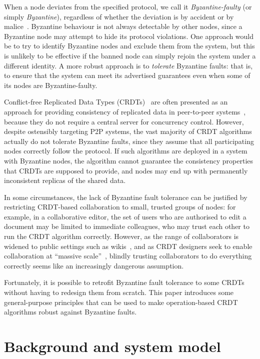 \documentclass[sigplan,review]{acmart}
\begin{document}
When a node deviates from the specified protocol, we call it \emph{Byzantine-faulty} (or simply \emph{Byzantine}), regardless of whether the deviation is by accident or by malice~\cite{Lamport:1982}.
Byzantine behaviour is not always detectable by other nodes, since a Byzantine node may attempt to hide its protocol violations.
One approach would be to try to identify Byzantine nodes and exclude them from the system, but this is unlikely to be effective if the banned node can simply rejoin the system under a different identity.
A more robust approach is to \emph{tolerate} Byzantine faults: that is, to ensure that the system can meet its advertised guarantees even when some of its nodes are Byzantine-faulty.

Conflict-free Replicated Data Types (CRDTs)~\cite{Shapiro:2011} are often presented as an approach for providing consistency of replicated data in peer-to-peer systems~\cite{vanderLinde:2017fu,Weiss:2009ht,Nicolaescu:2016}, because they do not require a central server for concurrency control.
However, despite ostensibly targeting P2P systems, the vast majority of CRDT algorithms actually do not tolerate Byzantine faults, since they assume that all participating nodes correctly follow the protocol.
If such algorithms are deployed in a system with Byzantine nodes, the algorithm cannot guarantee the consistency properties that CRDTs are supposed to provide, and nodes may end up with permanently inconsistent replicas of the shared data.

In some circumstances, the lack of Byzantine fault tolerance can be justified by restricting CRDT-based collaboration to small, trusted groups of nodes: for example, in a collaborative editor, the set of users who are authorised to edit a document may be limited to immediate colleagues, who may trust each other to run the CRDT algorithm correctly.
However, as the range of collaborators is widened to public settings such as wikis~\cite{Nedelec:2016eo,Weiss:2007,Weiss:2009ht}, and as CRDT designers seek to enable collaboration at ``massive scale''~\cite{Andre:2013,Weiss:2009ht,Lv:2016}, blindly trusting collaborators to do everything correctly seems like an increasingly dangerous assumption.

Fortunately, it is possible to retrofit Byzantine fault tolerance to some CRDTs without having to redesign them from scratch.
This paper introduces some general-purpose principles that can be used to make operation-based CRDT algorithms robust against Byzantine faults.

\section{Background and system model}\label{sec:background}
\end{document}
